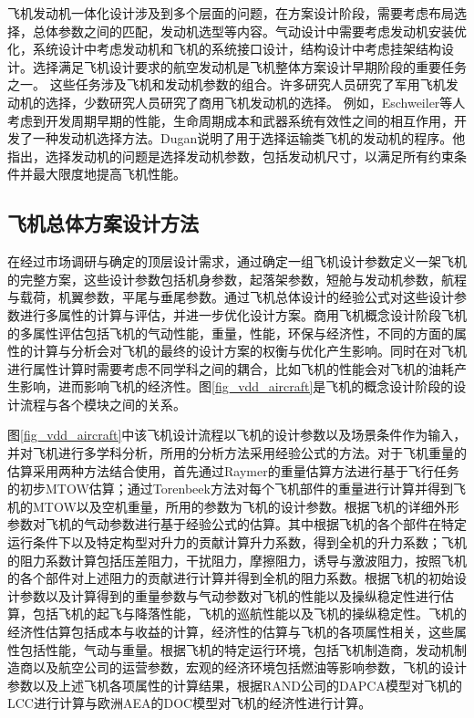 \documentclass[12pt,a4paper]{report}
\begin{document}
飞机发动机一体化设计涉及到多个层面的问题，在方案设计阶段，需要考虑布局选择，总体参数之间的匹配，发动机选型等内容。气动设计中需要考虑发动机安装优化，系统设计中考虑发动机和飞机的系统接口设计，结构设计中考虑挂架结构设计。选择满足飞机设计要求的航空发动机是飞机整体方案设计早期阶段的重要任务之一。 这些任务涉及飞机和发动机参数的组合。许多研究人员研究了军用飞机发动机的选择，少数研究人员研究了商用飞机发动机的选择。 例如，Eschweiler\cite{eschweiler}等人考虑到开发周期早期的性能，生命周期成本和武器系统有效性之间的相互作用，开发了一种发动机选择方法。Dugan\cite{dugan1972engine}说明了用于选择运输类飞机的发动机的程序。他指出，选择发动机的问题是选择发动机参数，包括发动机尺寸，以满足所有约束条件并最大限度地提高飞机性能。

\subsection{飞机总体方案设计方法}

在经过市场调研与确定的顶层设计需求，通过确定一组飞机设计参数定义一架飞机的完整方案，这些设计参数包括机身参数，起落架参数，短舱与发动机参数，航程与载荷，机翼参数，平尾与垂尾参数。通过飞机总体设计的经验公式对这些设计参数进行多属性的计算与评估，并进一步优化设计方案。商用飞机概念设计阶段飞机的多属性评估包括飞机的气动性能，重量，性能，环保与经济性，不同的方面的属性的计算与分析会对飞机的最终的设计方案的权衡与优化产生影响。同时在对飞机进行属性计算时需要考虑不同学科之间的耦合，比如飞机的性能会对飞机的油耗产生影响，进而影响飞机的经济性。图\ref{fig_vdd_aircraft}是飞机的概念设计阶段的设计流程与各个模块之间的关系。

图\ref{fig_vdd_aircraft}中该飞机设计流程以飞机的设计参数以及场景条件作为输入，并对飞机进行多学科分析，所用的分析方法采用经验公式的方法。对于飞机重量的估算采用两种方法结合使用，首先通过Raymer的重量估算方法进行基于飞行任务的初步MTOW估算；通过Torenbeek方法对每个飞机部件的重量进行计算并得到飞机的MTOW以及空机重量，所用的参数为飞机的设计参数。根据飞机的详细外形参数对飞机的气动参数进行基于经验公式的估算。其中根据飞机的各个部件在特定运行条件下以及特定构型对升力的贡献计算升力系数，得到全机的升力系数；飞机的阻力系数计算包括压差阻力，干扰阻力，摩擦阻力，诱导与激波阻力，按照飞机的各个部件对上述阻力的贡献进行计算并得到全机的阻力系数。根据飞机的初始设计参数以及计算得到的重量参数与气动参数对飞机的性能以及操纵稳定性进行估算，包括飞机的起飞与降落性能，飞机的巡航性能以及飞机的操纵稳定性。飞机的经济性估算包括成本与收益的计算，经济性的估算与飞机的各项属性相关，这些属性包括性能，气动与重量。根据飞机的特定运行环境，包括飞机制造商，发动机制造商以及航空公司的运营参数，宏观的经济环境包括燃油等影响参数，飞机的设计参数以及上述飞机各项属性的计算结果，根据RAND公司的DAPCA模型对飞机的LCC进行计算与欧洲AEA的DOC模型对飞机的经济性进行计算。
\end{document}
